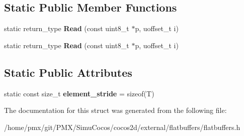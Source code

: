\subsection*{Static Public Member Functions}
\begin{DoxyCompactItemize}
\item 
\mbox{\label{structflatbuffers_1_1IndirectHelper_3_01const_01T_01_5_01_4_af05256f82faaed8f706105194245aec5}} 
static return\+\_\+type {\bfseries Read} (const uint8\+\_\+t $\ast$p, uoffset\+\_\+t i)
\item 
\mbox{\label{structflatbuffers_1_1IndirectHelper_3_01const_01T_01_5_01_4_af05256f82faaed8f706105194245aec5}} 
static return\+\_\+type {\bfseries Read} (const uint8\+\_\+t $\ast$p, uoffset\+\_\+t i)
\end{DoxyCompactItemize}
\subsection*{Static Public Attributes}
\begin{DoxyCompactItemize}
\item 
\mbox{\label{structflatbuffers_1_1IndirectHelper_3_01const_01T_01_5_01_4_a863380eaf59f7dd4df758d560613627b}} 
static const size\+\_\+t {\bfseries element\+\_\+stride} = sizeof(T)
\end{DoxyCompactItemize}


The documentation for this struct was generated from the following file\+:\begin{DoxyCompactItemize}
\item 
/home/pmx/git/\+P\+M\+X/\+Simu\+Cocos/cocos2d/external/flatbuffers/flatbuffers.\+h\end{DoxyCompactItemize}
